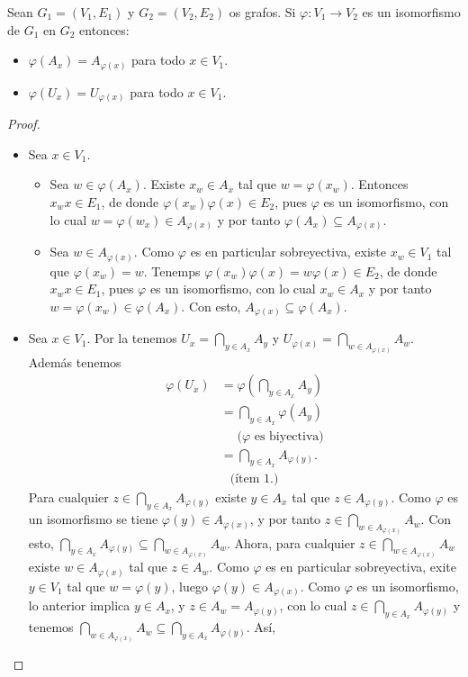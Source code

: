 \begin{Lema}\label{Lema:lema_homeomorfismo}
   Sean $G_1=(V_1,E_1)$ y $G_2=(V_2,E_2)$ os grafos. Si $\varphi:V_1\to V_2$ es un isomorfismo de $G_1$ en $G_2$ entonces:\begin{itemize}
      \item[1.] $\varphi (A_x) = A_{\varphi (x)}$ para todo $x\in V_1$.
      \item[2.] $\varphi (U_x) = U_{\varphi (x)}$ para todo $x\in V_1$.
   \end{itemize}
\end{Lema}
\begin{proof}
   \phantom{o}
   \begin{itemize}
      \item[1.] Sea $x\in V_1$.
         \begin{itemize}
            \item[$\subseteq$:] Sea $w\in\varphi(A_x)$. Existe $x_w\in A_x$ tal que $w=\varphi(x_w)$. Entonces $x_wx\in E_1$, de donde $\varphi(x_w)\varphi(x)\in E_2$, pues $\varphi$ es un isomorfismo, con lo cual $w=\varphi(w_x)\in A_{\varphi(x)}$ y por tanto $\varphi(A_x)\subseteq A_{\varphi(x)}$.
            \item[$\supseteq$:] Sea $w\in A_{\varphi(x)}$. Como $\varphi$ es en particular sobreyectiva, existe $x_w\in V_1$ tal que $\varphi(x_w)=w$. Tenemps $\varphi(x_w)\varphi(x)=w\varphi(x)\in E_2$, de donde $x_wx\in E_1$, pues $\varphi$ es un isomorfismo, con lo cual $x_w\in A_x$ y por tanto $w=\varphi(x_w)\in\varphi(A_x)$. Con esto, $A_{\varphi(x)}\subseteq\varphi(A_x)$.
         \end{itemize}
      \item[2.] Sea $x\in V_1$. Por la  tenemos $U_x=\bigcap_{y\in A_x}A_y$ y $U_{\varphi(x)}=\bigcap_{w\in A_{\varphi(x)}}A_w$. Además tenemos 
         $$
         \begin{aligned}
            \varphi(U_x)&=\varphi\left( \bigcap_{y\in A_x}A_y\right)\\
                        &=\bigcap_{y\in A_x}\varphi(A_y)\\
                        &\phantom{=}\text{(}\varphi\text{ es biyectiva)}\\
                        &=\bigcap_{y\in A_x}A_{\varphi(y)}.\\
                        &\phantom{=}\text{(ítem 1.)}
         \end{aligned}
         $$
         Para cualquier $z\in \bigcap_{y\in A_x}A_{\varphi(y)}$ existe $y\in A_x$ tal que $z\in A_{\varphi(y)}$. Como $\varphi$ es un isomorfismo se tiene $\varphi(y)\in A_{\varphi(x)}$, y por tanto $z\in\bigcap_{w\in A_{\varphi(x)}}A_w$. Con esto, $\bigcap_{y\in A_x}A_{\varphi(y)}\subseteq\bigcap_{w\in A_{\varphi(x)}}A_w$. Ahora, para cualquier $z\in\bigcap_{w\in A_{\varphi(x)}}A_w$ existe $w\in A_{\varphi(x)}$ tal que $z\in A_w$. Como $\varphi$ es en particular sobreyectiva, exite $y\in V_1$ tal que $w=\varphi(y)$, luego $\varphi(y)\in A_{\varphi(x)}$. Como $\varphi$ es un isomorfismo, lo anterior implica $y\in A_x$, y $z\in A_w=A_{\varphi(y)}$, con lo cual $z\in \bigcap_{y\in A_x}A_{\varphi(y)}$ y tenemos $\bigcap_{w\in A_{\varphi(x)}}A_w \subseteq \bigcap_{y\in A_x}A_{\varphi(y)}$. Así,

\end{itemize}
\end{proof}
